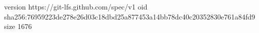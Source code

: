 version https://git-lfs.github.com/spec/v1
oid sha256:76959223de278e26d03c18dbd25a877453a14bb78dc40c20352830e761a84fd9
size 1676
